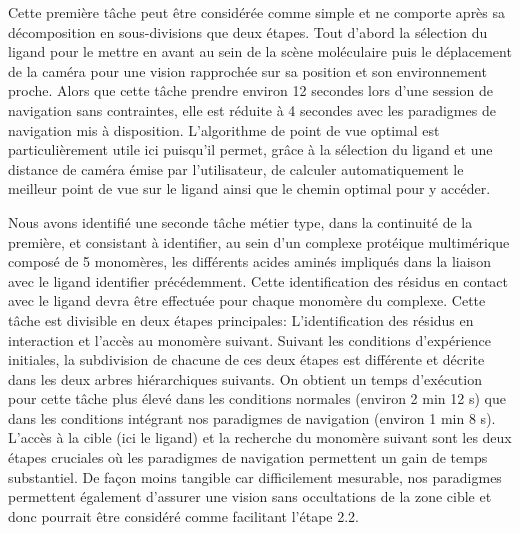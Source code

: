 Cette première tâche peut être considérée comme simple et ne comporte après sa décomposition en sous-divisions que deux étapes. Tout d'abord la sélection du ligand pour le mettre en avant au sein de la scène moléculaire puis le déplacement de la caméra pour une vision rapprochée sur sa position et son environnement proche. Alors que cette tâche prendre environ 12 secondes lors d'une session de navigation sans contraintes, elle est réduite à 4 secondes avec les paradigmes de navigation mis à disposition. L'algorithme de point de vue optimal est particulièrement utile ici puisqu'il permet, grâce à la sélection du ligand et une distance de caméra émise par l'utilisateur, de calculer automatiquement le meilleur point de vue sur le ligand ainsi que le chemin optimal pour y accéder.

Nous avons identifié une seconde tâche métier type, dans la continuité de la première, et consistant à identifier, au sein d'un complexe protéique multimérique composé de 5 monomères, les différents acides aminés impliqués dans la liaison avec le ligand identifier précédemment. Cette identification des résidus en contact avec le ligand devra être effectuée pour chaque monomère du complexe. Cette tâche est divisible en deux étapes principales: L'identification des résidus en interaction et l'accès au monomère suivant. Suivant les conditions d'expérience initiales, la subdivision de chacune de ces deux étapes est différente et décrite dans les deux arbres hiérarchiques suivants. On obtient un temps d’exécution pour cette tâche plus élevé dans les conditions normales (environ 2 min 12 s) que dans les conditions intégrant nos paradigmes de navigation (environ 1 min 8 s). L'accès à la cible (ici le ligand) et la recherche du monomère suivant sont les deux étapes cruciales où les paradigmes de navigation permettent un gain de temps substantiel. De façon moins tangible car difficilement mesurable, nos paradigmes permettent également d'assurer une vision sans occultations de la zone cible et donc pourrait être considéré comme facilitant l'étape 2.2.
\\
\\
